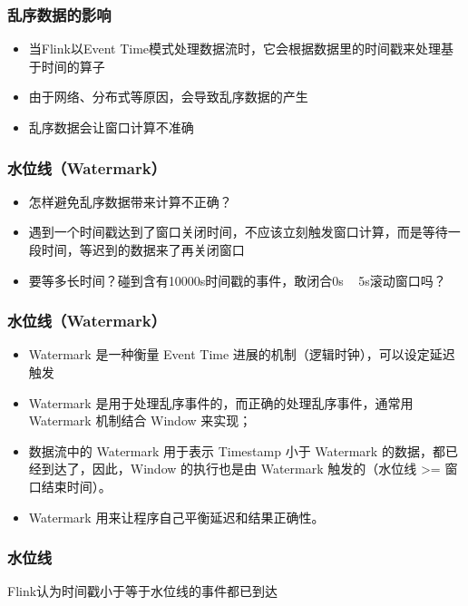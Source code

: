 \documentclass{beamer}
\begin{document}
  \begin{frame}
      \frametitle{乱序数据的影响}

      \begin{itemize}
        \item 当Flink以Event Time模式处理数据流时，它会根据数据里的时间戳来处理基于时间的算子
        \item 由于网络、分布式等原因，会导致乱序数据的产生
        \item 乱序数据会让窗口计算不准确
      \end{itemize}
  
  \end{frame}

  \begin{frame}
      \frametitle{水位线（Watermark）}
  
      \begin{itemize}
          \item 怎样避免乱序数据带来计算不正确？
          \item 遇到一个时间戳达到了窗口关闭时间，不应该立刻触发窗口计算，而是等待一段时间，等迟到的数据来了再关闭窗口
          \item 要等多长时间？碰到含有10000s时间戳的事件，敢闭合0s ~ 5s滚动窗口吗？
      \end{itemize}
  
  \end{frame}

  \begin{frame}
      \frametitle{水位线（Watermark）}
  
      \begin{itemize}
          \item Watermark 是一种衡量 Event Time 进展的机制（逻辑时钟），可以设定延迟触发
          \item Watermark 是用于处理乱序事件的，而正确的处理乱序事件，通常用 Watermark 机制结合 Window 来实现；
          \item 数据流中的 Watermark 用于表示 Timestamp 小于 Watermark 的数据，都已经到达了，因此，Window 的执行也是由 Watermark 触发的（水位线 >= 窗口结束时间）。
          \item Watermark 用来让程序自己平衡延迟和结果正确性。
      \end{itemize}
  
  \end{frame}

  \begin{frame}
      \frametitle{水位线}
      \begin{tcolorbox}
      	Flink认为时间戳小于等于水位线的事件都已到达
      \end{tcolorbox}
  \end{frame}
\end{document}
